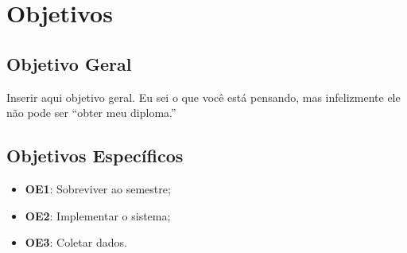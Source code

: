 \section{Objetivos}
\label{sec:objetivos}

\subsection{Objetivo Geral}
\label{sub:objetivogeral}

Inserir aqui objetivo geral. Eu sei o que você está pensando, mas infelizmente ele não pode ser \enquote{obter meu diploma.}

\subsection{Objetivos Específicos}
\label{sub:objetivosespecifos}

\begin{itemize}
    \item \textbf{OE1}: Sobreviver ao semestre;
    \item \textbf{OE2}: Implementar o sistema;
    \item \textbf{OE3}: Coletar dados.
\end{itemize}